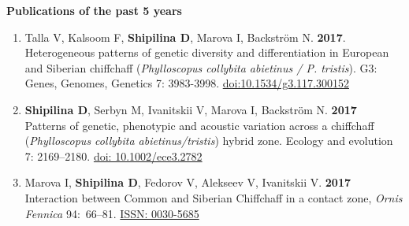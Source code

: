 \documentclass[10pt]{article}
\begin{document}
\begin{cv}
\begin{enumerate}
	\end{enumerate}
\textbf{\quad Publications of the past 5 years}
	\begin{enumerate}%
	\item Talla V, Kalsoom F, \textbf{Shipilina D}, Marova I, Backström N. \textbf{2017}. 
	Heterogeneous patterns of genetic diversity and differentiation in European and Siberian chiffchaff (\textit{Phylloscopus collybita abietinus / P. tristis}). G3: Genes, Genomes, Genetics 7: 3983-3998. \href{http://dx.doi.org/doi:10.1534/g3.117.300152}{doi:10.1534/g3.117.300152}
	 \item  \textbf{Shipilina D}, Serbyn M, Ivanitskii V, Marova I, Backström N. \textbf{2017}\\
	        Patterns of genetic, phenotypic and acoustic variation across a chiffchaff (\textit{Phylloscopus collybita abietinus/tristis}) hybrid zone. Ecology and evolution 7: 2169--2180. \href{http://dx.doi.org/doi: 10.1002/ece3.2782}{doi: 10.1002/ece3.2782}       
	 \item  Marova I, \textbf{Shipilina D}, Fedorov V, Alekseev V, Ivanitskii V. \textbf{2017}\\
	         Interaction between Common and Siberian Chiffchaff in a contact zone,  \textit{Ornis Fennica} 94:~66--81. \href{https://www.ornisfennica.org/pdf/latest/172Marova.pdf}{ISSN: 0030-5685} 
	         

\end{enumerate}
\end{cv}
\end{document}
